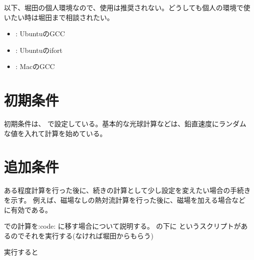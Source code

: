 \documentclass[letterpaper,10pt,dvipdfmx,report]{sphinxmanual}
\begin{document}
\sphinxAtStartPar
以下、堀田の個人環境なので、使用は推奨されない。どうしても個人の環境で使いたい時は堀田まで相談されたい。
\begin{itemize}
\item {} 
\sphinxAtStartPar
{}: UbuntuのGCC

\item {} 
\sphinxAtStartPar
{}: Ubuntuのifort

\item {} 
\sphinxAtStartPar
{}: MacのGCC

\end{itemize}


\section{初期条件}
\label{\detokenize{start:id3}}
\sphinxAtStartPar
初期条件は、  で設定している。基本的な光球計算などは、鉛直速度にランダムな値を入れて計算を始めている。


\section{追加条件}
\label{\detokenize{start:id4}}
\sphinxAtStartPar
ある程度計算を行った後に、続きの計算として少し設定を変えたい場合の手続きを示す。
例えば、磁場なしの熱対流計算を行った後に、磁場を加える場合などに有効である。

\sphinxAtStartPar
{} での計算を:code: に移す場合について説明する。
 の下に  というスクリプトがあるのでそれを実行する(なければ堀田からもらう)

\begin{sphinxVerbatim}[commandchars=\\\{\}]
 
\end{sphinxVerbatim}

\sphinxAtStartPar
実行すると

\begin{sphinxVerbatim}[commandchars=\\\{\}]
       
\end{sphinxVerbatim}
\end{document}
